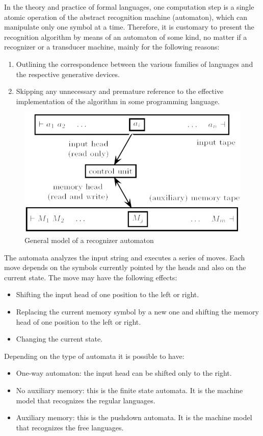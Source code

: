 In the theory and practice of formal languages, one computation step is a single atomic operation of the abstract recognition machine (automaton), which can manipulate only one symbol at a time.
Therefore, it is customary to present the recognition algorithm by means of an automaton of some kind, no matter if a recognizer or a transducer machine, mainly for the following reasons: 
\begin{enumerate}
    \item Outlining the correspondence between the various families of languages and the respective generative devices. 
    \item Skipping any unnecessary and premature reference to the effective implementation of the algorithm in some programming language.
\end{enumerate}
\begin{figure}[H]
    \centering
    \includegraphics[width=0.3\linewidth]{images/fsa.png}
    \caption{General model of a recognizer automaton}
\end{figure}
The automata analyzes the input string and executes a series of moves. 
Each move depends on the symbols currently pointed by the heads and also on the current state. 
The move may have the following effects: 
\begin{itemize}
    \item Shifting the input head of one position to the left or right.
    \item Replacing the current memory symbol by a new one and shifting the memory head of one position to the left or right. 
    \item Changing the current state. 
\end{itemize}
Depending on the type of automata it is possible to have: 
\begin{itemize}
    \item One-way automaton: the input head can be shifted only to the right.
    \item No auxiliary memory: this is the finite state automata. 
        It is the machine model that recognizes the regular languages. 
    \item Auxiliary memory: this is the pushdown automata. 
        It is the machine model that recognizes the free languages. 
\end{itemize}
